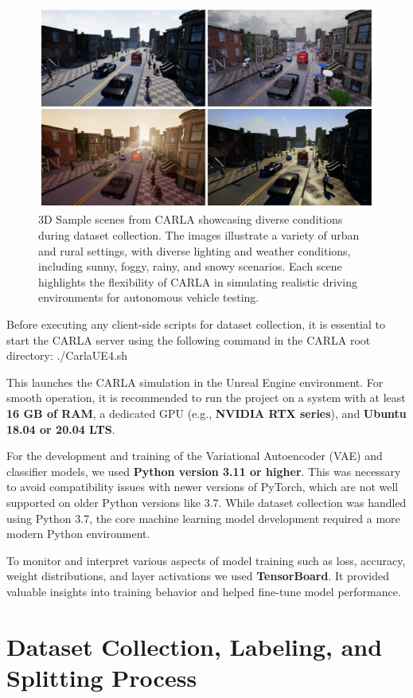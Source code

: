 \begin{figure}
    \centering
    \includegraphics[width=0.7\linewidth]{img/carla/CARLA_Environment.png}
    \caption{3D Sample scenes from CARLA showcasing diverse conditions during dataset collection. The images illustrate a variety of urban and rural settings, with diverse lighting and weather conditions, including sunny, foggy, rainy, and snowy scenarios. Each scene highlights the flexibility of CARLA in simulating realistic driving environments for autonomous vehicle testing.}
    \label{fig:carla_scenes}
\end{figure}


Before executing any client-side scripts for dataset collection, it is essential to start the CARLA server using the following command in the CARLA root directory: ./CarlaUE4.sh


This launches the CARLA simulation in the Unreal Engine environment. For smooth operation, it is recommended to run the project on a system with at least \textbf{16 GB of RAM}, a dedicated GPU (e.g., \textbf{NVIDIA RTX series}), and \textbf{Ubuntu 18.04 or 20.04 LTS}. 

For the development and training of the Variational Autoencoder (VAE) and classifier models, we used \textbf{Python version 3.11 or higher}. This was necessary to avoid compatibility issues with newer versions of PyTorch, which are not well supported on older Python versions like 3.7. While dataset collection was handled using Python 3.7, the core machine learning model development required a more modern Python environment.  

To monitor and interpret various aspects of model training such as loss, accuracy, weight distributions, and layer activations we used \textbf{TensorBoard}. It provided valuable insights into training behavior and helped fine-tune model performance.

\section{Dataset Collection, Labeling, and Splitting Process}

